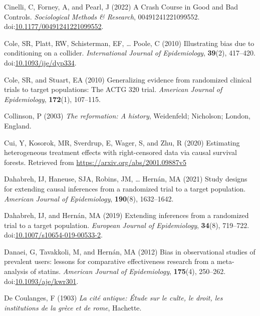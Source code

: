 \documentclass[
  singlecolumn]{article}
\newlength{\cslhangindent}
\newenvironment{CSLReferences}[2] %
 {\begin{list}{}{%
  \setlength{\itemindent}{0pt}
  \setlength{\leftmargin}{0pt}
  \setlength{\parsep}{0pt}
  \ifodd #1
   \setlength{\leftmargin}{\cslhangindent}
   \setlength{\itemindent}{-1\cslhangindent}
  \fi
  \setlength{\itemsep}{#2\baselineskip}}}
 {\end{list}}
\begin{document}
\begin{CSLReferences}{1}{0}
Cinelli, C, Forney, A, and Pearl, J (2022) A Crash Course in Good and
Bad Controls. \emph{Sociological Methods \& Research},
00491241221099552.
doi:\href{https://doi.org/10.1177/00491241221099552}{10.1177/00491241221099552}.

Cole, SR, Platt, RW, Schisterman, EF, \ldots{} Poole, C (2010)
Illustrating bias due to conditioning on a collider. \emph{International
Journal of Epidemiology}, \textbf{39}(2), 417--420.
doi:\href{https://doi.org/10.1093/ije/dyp334}{10.1093/ije/dyp334}.

Cole, SR, and Stuart, EA (2010) Generalizing evidence from randomized
clinical trials to target populations: The ACTG 320 trial.
\emph{American Journal of Epidemiology}, \textbf{172}(1), 107--115.

Collinson, P (2003) \emph{The reformation: A history}, Weidenfeld;
Nicholson; London, England.

Cui, Y, Kosorok, MR, Sverdrup, E, Wager, S, and Zhu, R (2020) Estimating
heterogeneous treatment effects with right-censored data via causal
survival forests. Retrieved from
\url{https://arxiv.org/abs/2001.09887v5}

Dahabreh, IJ, Haneuse, SJA, Robins, JM, \ldots{} Hernán, MA (2021) Study
designs for extending causal inferences from a randomized trial to a
target population. \emph{American Journal of Epidemiology},
\textbf{190}(8), 1632--1642.

Dahabreh, IJ, and Hernán, MA (2019) Extending inferences from a
randomized trial to a target population. \emph{European Journal of
Epidemiology}, \textbf{34}(8), 719--722.
doi:\href{https://doi.org/10.1007/s10654-019-00533-2}{10.1007/s10654-019-00533-2}.

Danaei, G, Tavakkoli, M, and Hernán, MA (2012) Bias in observational
studies of prevalent users: lessons for comparative effectiveness
research from a meta-analysis of statins. \emph{American Journal of
Epidemiology}, \textbf{175}(4), 250--262.
doi:\href{https://doi.org/10.1093/aje/kwr301}{10.1093/aje/kwr301}.

De Coulanges, F (1903) \emph{La cité antique: Étude sur le culte, le
droit, les institutions de la grèce et de rome}, Hachette.


\end{CSLReferences}
\end{document}
